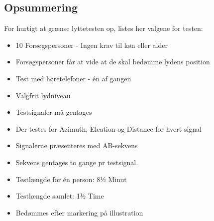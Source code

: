 \subsection{Opsummering}

For hurtigt at grænse lyttetesten op, listes her valgene for testen:

\begin{itemize}
	\item 10 Forsøgspersoner - Ingen krav til køn eller alder
	\item Forsøgspersoner får at vide at de skal bedømme lydens position
	\item Test med høretelefoner - én af gangen
	\item Valgfrit lydniveau
	\item Testsignaler må gentages
	\item Der testes for Azimuth, Eleation og Distance for hvert signal
	\item Signalerne præsenteres med AB-sekvens
	\item Sekvens gentages to gange pr testsignal.
	\item Testlængde for én person: 8½ Minut
	\item Testlængde samlet: 1½ Time
	\item Bedømmes efter markering på illustration
	
\end{itemize}

\clearpage